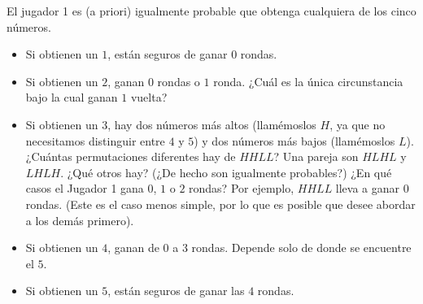 \begin{solutionorbox}
	El jugador 1 es (a priori) igualmente probable que obtenga cualquiera de los cinco números.
	\begin{itemize}
		\item Si obtienen un $1$, están seguros de ganar $0$ rondas.
		\item Si obtienen un $2$, ganan $0$ rondas o $1$ ronda. ¿Cuál es la única circunstancia bajo la cual ganan $1$ vuelta?
		\item Si obtienen un $3$, hay dos números más altos (llamémoslos $H$, ya que no necesitamos distinguir entre $4$ y $5$) y dos números más bajos (llamémoslos $L$). ¿Cuántas permutaciones diferentes hay de $HHLL$? Una pareja son $HLHL$ y $LHLH$. ¿Qué otros hay? (¿De hecho son igualmente probables?) ¿En qué casos el Jugador 1 gana $0$, $1$ o $2$ rondas? Por ejemplo, $HHLL$ lleva a ganar $0$ rondas. (Este es el caso menos simple, por lo que es posible que desee abordar a los demás primero).
		\item Si obtienen un $4$, ganan de $0$ a $3$ rondas. Depende solo de donde se encuentre el $5$.
		\item Si obtienen un $5$, están seguros de ganar las $4$ rondas.
	\end{itemize}
	\end{solutionorbox}